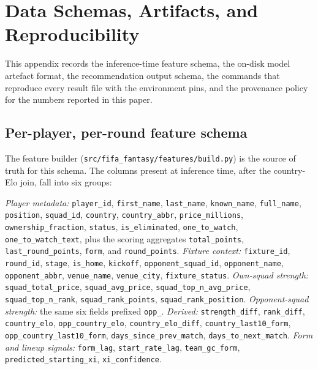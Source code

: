 \section{Data Schemas, Artifacts, and Reproducibility}
\label{sec:a}

This appendix records the inference-time feature schema, the on-disk
model artefact format, the recommendation output schema, the commands
that reproduce every result file with the environment pins, and the
provenance policy for the numbers reported in this paper.

\subsection{Per-player, per-round feature schema}
\label{sec:appendix-a-features}

The feature builder
(\texttt{src/fifa\_fantasy/features/build.py}) is the source of
truth for this schema. The columns present at inference time, after
the country-Elo join, fall into six groups:

{\sloppy
\emph{Player metadata:} \texttt{player\_id}, \texttt{first\_name},
\texttt{last\_name}, \texttt{known\_name}, \texttt{full\_name},
\texttt{position}, \texttt{squad\_id}, \texttt{country},
\texttt{country\_abbr}, \texttt{price\_millions},
\texttt{ownership\_fraction}, \texttt{status},
\texttt{is\_eliminated}, \texttt{one\_to\_watch},
\texttt{one\_to\_watch\_text}, plus the scoring aggregates
\texttt{total\_points}, \texttt{last\_round\_points}, \texttt{form},
and \texttt{round\_points}.
\emph{Fixture context:} \texttt{fixture\_id}, \texttt{round\_id},
\texttt{stage}, \texttt{is\_home}, \texttt{kickoff},
\texttt{opponent\_squad\_id}, \texttt{opponent\_name},
\texttt{opponent\_abbr}, \texttt{venue\_name}, \texttt{venue\_city},
\texttt{fixture\_status}.
\emph{Own-squad strength:} \texttt{squad\_total\_price},
\texttt{squad\_avg\_price}, \texttt{squad\_top\_n\_avg\_price},
\texttt{squad\_top\_n\_rank}, \texttt{squad\_rank\_points},
\texttt{squad\_rank\_position}.
\emph{Opponent-squad strength:} the same six fields prefixed
\texttt{opp\_}.
\emph{Derived:} \texttt{strength\_diff}, \texttt{rank\_diff},
\texttt{country\_elo}, \texttt{opp\_country\_elo},
\texttt{country\_elo\_diff}, \texttt{country\_last10\_form},
\texttt{opp\_country\_last10\_form},
\texttt{days\_since\_prev\_match}, \texttt{days\_to\_next\_match}.
\emph{Form and lineup signals:} \texttt{form\_lag},
\texttt{start\_rate\_lag}, \texttt{team\_gc\_form},
\texttt{predicted\_starting\_xi}, \texttt{xi\_confidence}.\par}

